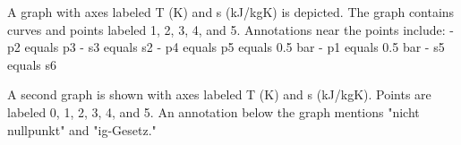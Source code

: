 A graph with axes labeled T (K) and s (kJ/kgK) is depicted. The graph contains curves and points labeled 1, 2, 3, 4, and 5. Annotations near the points include:
- p2 equals p3
- s3 equals s2
- p4 equals p5 equals 0.5 bar
- p1 equals 0.5 bar
- s5 equals s6

A second graph is shown with axes labeled T (K) and s (kJ/kgK). Points are labeled 0, 1, 2, 3, 4, and 5. An annotation below the graph mentions "nicht nullpunkt" and "ig-Gesetz."